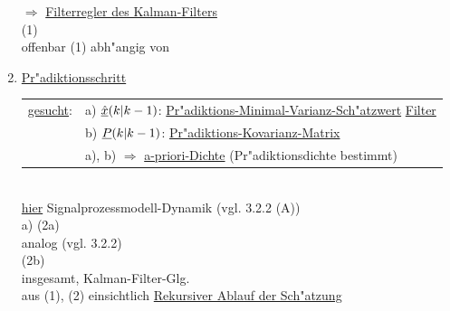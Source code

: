 \documentclass[openany,a4paper,11pt]{book}
\begin{document}
\begin{enumerate}
    $\Rightarrow$ \uline{Filterregler des Kalman-Filters}\\[3pt]
     \quad (1)\\
    offenbar (1) abh"angig von
    \item \uline{Pr"adiktionsschritt}\\
    \begin{tabular}{ll}
    \uline{gesucht}: & a) $\uline{\hat{x}}(k|k-1)$: \uline{Pr"adiktions-Minimal-Varianz-Sch"atzwert} \uline{Filter}\\
    & b) $\uline{P}(k|k-1)$: \uline{Pr"adiktions-Kovarianz-Matrix} \\
    & a), b) $\Rightarrow$ \uline{a-priori-Dichte} (Pr"adiktionsdichte bestimmt)\\
    \end{tabular}\\
    \uline{hier} Signalprozessmodell-Dynamik (vgl. 3.2.2 (A))\\
    a)  \quad (2a)\\
    analog (vgl. 3.2.2)\\
     \quad (2b)\\
    insgesamt, Kalman-Filter-Glg. \\
    aus (1), (2) einsichtlich \uline{Rekursiver Ablauf der Sch"atzung}\\
\end{enumerate}
\end{document}
